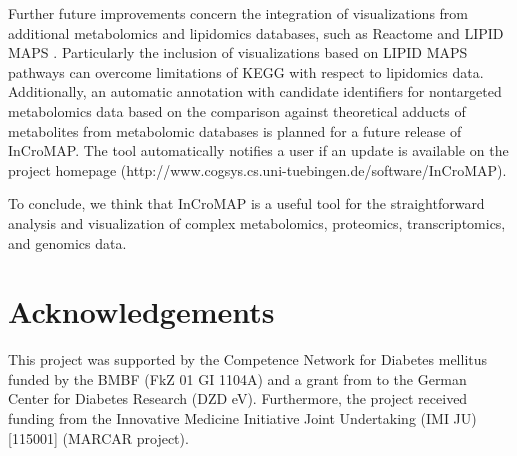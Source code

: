 \documentclass[final,5p,times,twocolumn]{elsarticle}
\begin{document}
Further future improvements concern the integration of visualizations from additional metabolomics and lipidomics databases, such as Reactome \cite{Eustachio2011} and LIPID MAPS \cite{Sud2007}. Particularly the inclusion of visualizations based on LIPID MAPS pathways can overcome limitations of KEGG with respect to lipidomics data. Additionally, an automatic annotation with candidate identifiers for nontargeted metabolomics data based on the comparison against theoretical adducts of metabolites from metabolomic databases is planned for a future release of InCroMAP. The tool automatically notifies a user if an update is available on the project homepage (http://www.cogsys.cs.uni-tuebingen.de/software/InCroMAP).

To conclude, we think that InCroMAP is a useful tool for the straightforward analysis and visualization of complex metabolomics, proteomics, transcriptomics, and genomics data.

\section{Acknowledgements}
This project was supported by the Competence Network for Diabetes mellitus funded
by the BMBF (FkZ 01 GI 1104A) and a grant from to the German Center for Diabetes Research (DZD eV). Furthermore, the project received funding from the Innovative Medicine Initiative Joint Undertaking (IMI JU) [115001] (MARCAR project).














\end{document}
